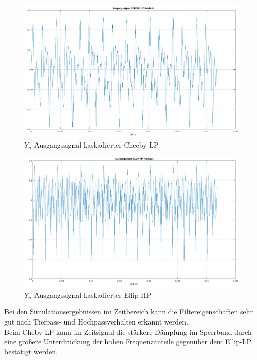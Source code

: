 \clearpage

\begin{figure}[h]
\centering
\includegraphics[width=0.7\linewidth]{Bilder/Attachment_D_Ausgangssignal_cheby_lp}
\caption{$Y_{n}$ Ausgangssignal kaskadierter Checby-LP}
\label{fig:Attachment_D_Ausgangssignal_cheby_lp}
\end{figure}

\begin{figure}[h]
\centering
\includegraphics[width=0.7\linewidth]{Bilder/Attachment_D_Ausgangssignal_ellip_hp}
\caption{$Y_{n}$ Ausgangssignal kaskadierter Ellip-HP}
\label{fig:Attachment_D_Ausgangssignal_ellip_hp}
\end{figure}

\noindent Bei den Simulationsergebnissen im Zeitbereich kann die Filtereigenschaften sehr gut nach Tiefpass- und Hochpassverhalten erkannt werden.\\
Beim Cheby-LP kann im Zeitsignal die stärkere Dämpfung im Sperrband durch eine größere Unterdrückung der hohen Frequenzanteile gegenüber dem Ellip-LP bestätigt werden.

\clearpage

